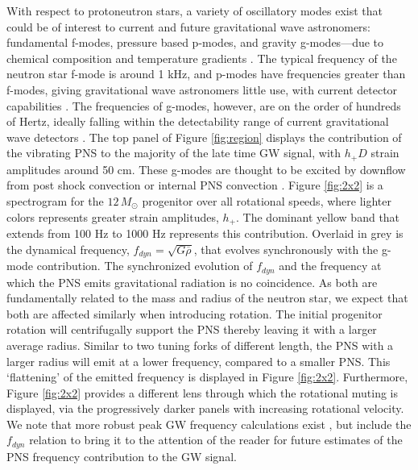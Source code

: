 \documentclass[twocolumn,times]{aastex62}  %
\begin{document}
 
With respect to protoneutron stars, a variety of oscillatory modes exist that could be of interest to current and future gravitational wave astronomers: fundamental f-modes, pressure based p-modes, and gravity g-modes---due to chemical composition and temperature gradients \citep{unno:1989}.  The typical frequency of the neutron star f-mode is around 1 kHz, and p-modes have frequencies greater than f-modes, giving gravitational wave astronomers little use, with current detector capabilities \citep{ho:2018}.  The frequencies of g-modes, however, are on the order of hundreds of Hertz, ideally falling within the detectability range of current gravitational wave detectors \citep{martynov:2016}.  The top panel of Figure \ref{fig:region} displays the contribution of the vibrating PNS to the majority of the late time GW signal, with $h_+D$ strain amplitudes around 50 cm.  These g-modes are thought to be excited by downflow from post shock convection or internal PNS convection \citep{murphy:2009,marek:2009b,muller:2013}.  Figure \ref{fig:2x2} is a spectrogram for the $12 \, M_\odot$ progenitor over all rotational speeds, where lighter colors represents greater strain amplitudes, $h_+$.  The dominant yellow band that extends from 100 Hz to 1000 Hz represents this contribution.  Overlaid in grey is the dynamical frequency, $f_{dyn} = \sqrt{G \overline{\rho}}$, that evolves synchronously with the g-mode contribution.  The synchronized evolution of $f_{dyn}$ and the frequency at which the PNS emits gravitational radiation is no coincidence.  As both are fundamentally related to the mass and radius of the neutron star, we expect that both are affected similarly when introducing rotation.  The initial progenitor rotation will centrifugally support the PNS thereby leaving it with a larger average radius.  Similar to two tuning forks of different length, the PNS with a larger radius will emit at a lower frequency, compared to a smaller PNS.  This `flattening' of the emitted frequency is displayed in Figure \ref{fig:2x2}.  Furthermore, Figure \ref{fig:2x2} provides a different lens through which the rotational muting is displayed, via the progressively darker panels with increasing rotational velocity.  We note that more robust peak GW frequency calculations exist \citep[eg.][]{muller:2013}, but include the $f_{dyn}$ relation to bring it to the attention of the reader for future estimates of the PNS frequency contribution to the GW signal.
\end{document}
